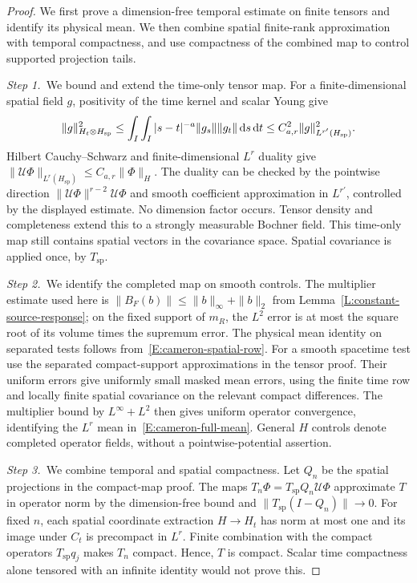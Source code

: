 \begin{proof}
  We first prove a dimension-free temporal estimate on finite tensors and
  identify its physical mean. We then combine spatial finite-rank
  approximation with temporal compactness, and use compactness of the combined
  map to control supported projection tails.


  \medskip
  \noindent\textit{Step 1.~}We bound and extend the time-only tensor map.
  For a finite-dimensional spatial field $g$, positivity of the time kernel and
  scalar Young give
  \[
    \|g\|_{H_t\otimes H_{\mathrm{sp}}}^2
    \le\int_I\int_I|s-t|^{-a}\|g_s\|\|g_t\|\,\mathrm{d} s\,\mathrm{d} t
    \le C_{a,r}^2\|g\|_{L^{r'}(H_{\mathrm{sp}})}^2.
  \]
  Hilbert Cauchy--Schwarz and finite-dimensional $L^r$ duality give
  $\|\mathcal{U}\Phi\|_{L^r(H_{\mathrm{sp}})} \le C_{a,r}\|\Phi\|_H$. The
  duality can be checked by the pointwise direction
  $\|\mathcal{U}\Phi\|^{r-2}\mathcal{U}\Phi$ and smooth coefficient
  approximation in $L^{r'}$, controlled by the displayed estimate. No dimension
  factor occurs. Tensor density and completeness extend this to a strongly
  measurable Bochner field. This time-only map still contains spatial vectors in
  the covariance space. Spatial covariance is applied once, by
  $T_{\mathrm{sp}}$.


  \medskip
  \noindent\textit{Step 2.~}We identify the completed map on smooth controls.
  The multiplier estimate used here is $\|B_F(b)\|\le\|b\|_\infty+\|b\|_2$
  from Lemma~\ref{L:constant-source-response}; on the fixed support of $m_R$,
  the $L^2$ error is at most the square root of its volume times the supremum
  error.
  The physical mean identity on separated tests follows
  from~\eqref{E:cameron-spatial-row}. For a smooth spacetime test use the
  separated compact-support approximations in the tensor proof. Their uniform
  errors give uniformly small masked mean errors, using the finite time row and
  locally finite spatial covariance on the relevant compact differences. The
  multiplier bound by $L^\infty+L^2$ then gives uniform operator convergence,
  identifying the $L^r$ mean in~\eqref{E:cameron-full-mean}. General $H$
  controls denote completed operator fields, without a pointwise-potential
  assertion.


  \medskip
  \noindent\textit{Step 3.~}We combine temporal and spatial compactness.
  Let $Q_n$ be the spatial projections in the compact-map proof. The maps
  $T_n\Phi = T_{\mathrm{sp}}Q_n\mathcal{U}\Phi$ approximate $T$ in operator norm
  by the dimension-free bound and $\|T_{\mathrm{sp}}(I-Q_n)\| \to 0$. For fixed
  $n$, each spatial coordinate extraction $H \to H_t$ has norm at most one and
  its image under $C_t$ is precompact in $L^r$. Finite combination with the
  compact operators $T_{\mathrm{sp}}q_j$ makes $T_n$ compact. Hence, $T$ is
  compact. Scalar time compactness alone tensored with an infinite identity
  would not prove this.



\end{proof}
